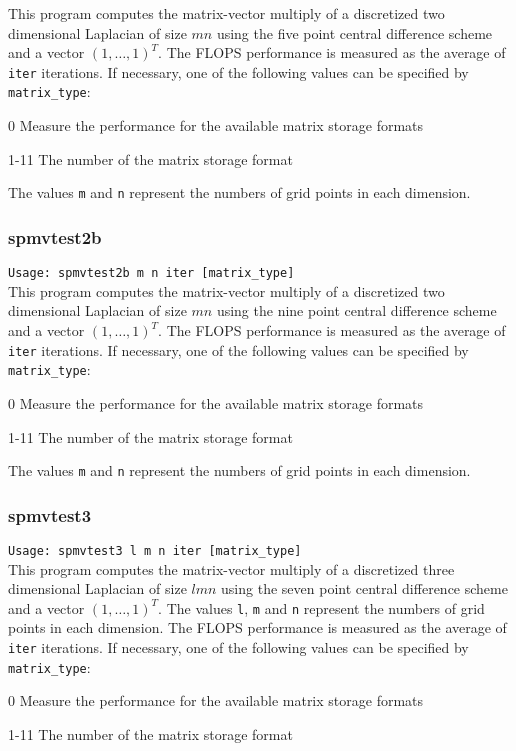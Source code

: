\documentclass[a4paper]{article}
\newcommand{\namelistlabel}[1]{\mbox{#1}\hfill}
\newenvironment{namelist}[1]{%
\begin{list}{}
  {\let\makelabel\namelistlabel
  \settowidth{\labelwidth}{#1}
  \setlength{\leftmargin}{1.1\labelwidth}}
  }{%
\end{list}}
\begin{document}
This program computes the matrix-vector multiply of a 
discretized two dimensional Laplacian of size $mn$ using 
the five point central difference scheme 
and a vector $(1,\dots,1)^T$. 
The FLOPS performance is measured as the average of {\tt iter}
iterations.
If necessary, one of the following values can be specified by {\tt matrix\_type}:
\begin{namelist}{XXXXXXXXXXXXXXXXXXXX}
\item[0] Measure the performance for the available matrix storage formats
\item[1-11] The number of the matrix storage format
\end{namelist}
The values {\tt m} and {\tt n} represent the numbers of grid points 
in each dimension. 

\subsubsection{spmvtest2b}

\verb+Usage: spmvtest2b m n iter [matrix_type]+\\

This program computes the matrix-vector multiply of a 
discretized two dimensional Laplacian of size $mn$ using 
the nine point central difference scheme 
and a vector $(1,\dots,1)^T$. 
The FLOPS performance is measured as the average of {\tt iter}
iterations.
If necessary, one of the following values can be specified by {\tt matrix\_type}:
\begin{namelist}{XXXXXXXXXXXXXXXXXXXX}
\item[0] Measure the performance for the available matrix storage formats
\item[1-11] The number of the matrix storage format
\end{namelist}
The values {\tt m} and {\tt n} represent the numbers of grid points 
in each dimension. 

\subsubsection{spmvtest3}

\verb+Usage: spmvtest3 l m n iter [matrix_type]+\\

This program computes the matrix-vector multiply of a 
discretized three dimensional Laplacian of size $lmn$ using 
the seven point central difference scheme and a vector $(1,\dots,1)^T$. 
The values {\tt l}, {\tt m} and {\tt n} represent the numbers of grid
points in each dimension. 
The FLOPS performance is measured as the average of {\tt iter}
iterations.
If necessary, one of the following values can be specified by {\tt matrix\_type}:
\begin{namelist}{XXXXXXXXXXXXXXXXXXXX}
\item[0] Measure the performance for the available matrix storage formats
\item[1-11] The number of the matrix storage format
\end{namelist}
\end{document}

